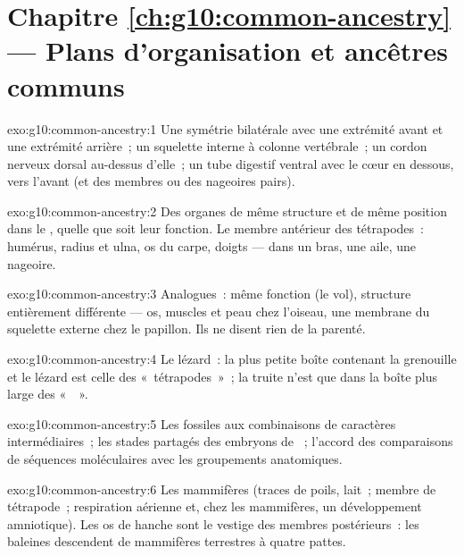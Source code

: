 \section*{Chapitre \ref{ch:g10:common-ancestry} --- Plans d'organisation et ancêtres communs}

\begin{solution}{exo:g10:common-ancestry:1}
Une symétrie bilatérale avec une extrémité avant et une extrémité
arrière~; un squelette interne à colonne vertébrale~; un cordon nerveux
dorsal au-dessus d'elle~; un tube digestif ventral avec le cœur en
dessous, vers l'avant (et des membres ou des nageoires pairs).
\end{solution}

\begin{solution}{exo:g10:common-ancestry:2}
Des organes de même structure et de même position dans le , quelle que soit leur fonction. Le membre antérieur des
tétrapodes~: humérus, radius et ulna, os du carpe, doigts --- dans un
bras, une aile, une nageoire.
\end{solution}

\begin{solution}{exo:g10:common-ancestry:3}
Analogues~: même fonction (le vol), structure entièrement différente
--- os, muscles et peau chez l'oiseau, une membrane du squelette
externe chez le papillon. Ils ne disent rien de la parenté.
\end{solution}

\begin{solution}{exo:g10:common-ancestry:4}
Le lézard~: la plus petite boîte contenant la grenouille et le lézard
est celle des «~tétrapodes~»~; la truite n'est que dans la boîte plus
large des «~~».
\end{solution}

\begin{solution}{exo:g10:common-ancestry:5}
Les fossiles aux combinaisons de caractères intermédiaires~; les stades
partagés des embryons de ~; l'accord des comparaisons de
séquences moléculaires avec les groupements anatomiques.
\end{solution}

\begin{solution}{exo:g10:common-ancestry:6}
Les mammifères (traces de poils, lait~; membre de tétrapode~;
respiration aérienne et, chez les mammifères, un développement
amniotique). Les os de hanche sont le vestige des membres postérieurs~:
les baleines descendent de mammifères terrestres à quatre pattes.
\end{solution}

